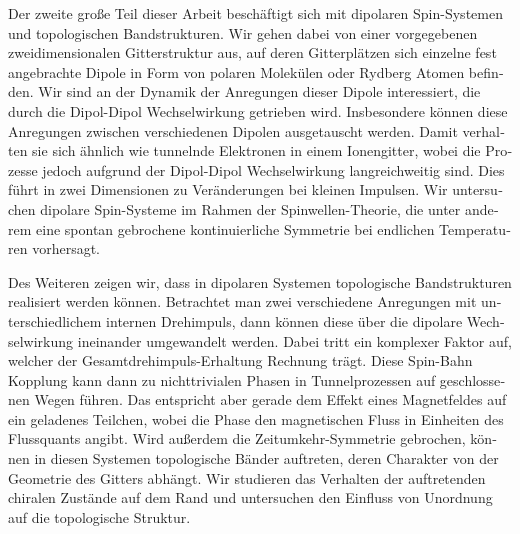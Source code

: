 \begin{otherlanguage}{ngerman}
Der zweite große Teil dieser Arbeit beschäftigt sich mit dipolaren Spin-Systemen und topologischen Bandstrukturen.
Wir gehen dabei von einer vorgegebenen zweidimensionalen Gitterstruktur aus, auf deren Gitterplätzen sich einzelne fest angebrachte Dipole in Form von polaren Molekülen oder Rydberg Atomen befinden.
Wir sind an der Dynamik der Anregungen dieser Dipole interessiert, die durch die Dipol-Dipol Wechselwirkung getrieben wird.
Insbesondere können diese Anregungen zwischen verschiedenen Dipolen ausgetauscht werden.
Damit verhalten sie sich ähnlich wie tunnelnde Elektronen in einem Ionengitter, wobei die Prozesse jedoch aufgrund der Dipol-Dipol Wechselwirkung langreichweitig sind.
Dies führt in zwei Dimensionen zu Veränderungen bei kleinen Impulsen.
Wir untersuchen dipolare Spin-Systeme im Rahmen der Spinwellen-Theorie, die unter anderem eine spontan gebrochene kontinuierliche Symmetrie bei endlichen Temperaturen vorhersagt.

Des Weiteren zeigen wir, dass in dipolaren Systemen topologische Bandstrukturen realisiert werden können.
Betrachtet man zwei verschiedene Anregungen mit unterschiedlichem internen Drehimpuls, dann können diese über die dipolare Wechselwirkung ineinander umgewandelt werden.
Dabei tritt ein komplexer Faktor auf, welcher der Gesamtdrehimpuls-Erhaltung Rechnung trägt.
Diese Spin-Bahn Kopplung kann dann zu nichttrivialen Phasen in Tunnelprozessen auf geschlossenen Wegen führen.
Das entspricht aber gerade dem Effekt eines Magnetfeldes auf ein geladenes Teilchen, wobei die Phase den magnetischen Fluss in Einheiten des Flussquants angibt.
Wird außerdem die Zeitumkehr-Symmetrie gebrochen, können in diesen Systemen topologische Bänder auftreten, deren Charakter von der Geometrie des Gitters abhängt.
Wir studieren das Verhalten der auftretenden chiralen Zustände auf dem Rand und untersuchen den Einfluss von Unordnung auf die topologische Struktur.


\end{otherlanguage}
